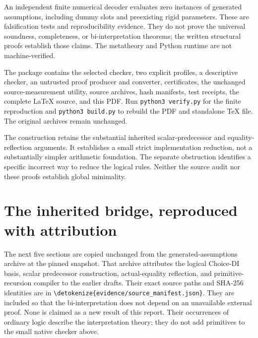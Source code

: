 \documentclass[11pt,letterpaper]{article}
\theoremstyle{definition}\newtheorem{definition}[theorem]{Definition}
\theoremstyle{remark}\newtheorem{remark}[theorem]{Remark}
\newcommand{\file}[1]{\expandafter\nolinkurl\expandafter{\detokenize{#1}}}
\begin{document}
An independent finite numerical decoder evaluates zero instances of
generated assumptions, including dummy slots and preexisting rigid
parameters. These are falsification tests and reproducibility evidence.
They do not prove the universal soundness, completeness, or
bi-interpretation theorems; the written structural proofs establish
those claims. The metatheory and Python runtime are not machine-verified.

The package contains the selected checker, two explicit profiles, a
descriptive checker, an untrusted proof producer and converter,
certificates, the unchanged source-measurement utility, source archives,
hash manifests, test receipts, the complete LaTeX source, and this PDF.
Run \texttt{python3 verify.py} for the finite reproduction and
\texttt{python3 build.py} to rebuild the PDF and standalone TeX file.
The original archives remain unchanged.

The construction retains the substantial inherited scalar-predecessor
and equality-reflection arguments. It establishes a small strict
implementation reduction, not a substantially simpler arithmetic
foundation. The separate obstruction identifies a specific incorrect
way to reduce the logical rules. Neither the source audit nor these
proofs establish global minimality.

\appendix


\clearpage
\section*{The inherited bridge, reproduced with attribution}
The next five sections are copied unchanged from the generated-assumptions
archive at the pinned snapshot. That archive attributes the logical
Choice-DI basis, scalar predecessor construction, actual-equality
reflection, and primitive-recursion compiler to the earlier drafts.
Their exact source paths and SHA-256 identities are in
\file{evidence/source_manifest.json}. They are included so that the
bi-interpretation does not depend on an unavailable external proof.
None is claimed as a new result of this report. Their occurrences of
ordinary logic describe the interpretation theory; they do not add
primitives to the small native checker above.





\end{document}
